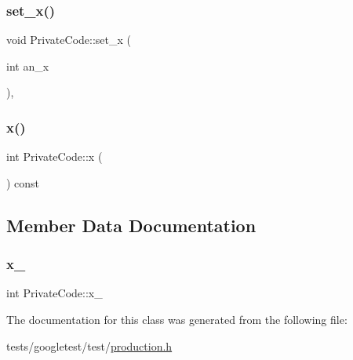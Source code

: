 \mbox{\label{classPrivateCode_a8d8ac6564d6425ea793f85848bb21b39}} 
\subsubsection{\texorpdfstring{set\+\_\+x()}{set\_x()}}
{\footnotesize\ttfamily void Private\+Code\+::set\+\_\+x (\begin{DoxyParamCaption}\item[{int}]{an\+\_\+x }\end{DoxyParamCaption})\hspace{0.3cm}{\ttfamily [inline]}, {\ttfamily [private]}}

\mbox{\label{classPrivateCode_a247781246ce4d0c66563eaa39ba5aaa9}} 
\subsubsection{\texorpdfstring{x()}{x()}}
{\footnotesize\ttfamily int Private\+Code\+::x (\begin{DoxyParamCaption}{ }\end{DoxyParamCaption}) const\hspace{0.3cm}{\ttfamily [inline]}}



\subsection{Member Data Documentation}
\mbox{\label{classPrivateCode_a3590a614d8c76fa34fa4cea6f340c37f}} 
\subsubsection{\texorpdfstring{x\+\_\+}{x\_}}
{\footnotesize\ttfamily int Private\+Code\+::x\+\_\+\hspace{0.3cm}{\ttfamily [private]}}



The documentation for this class was generated from the following file\+:\begin{DoxyCompactItemize}
\item 
tests/googletest/test/\hyperlink{production_8h}{production.\+h}\end{DoxyCompactItemize}
